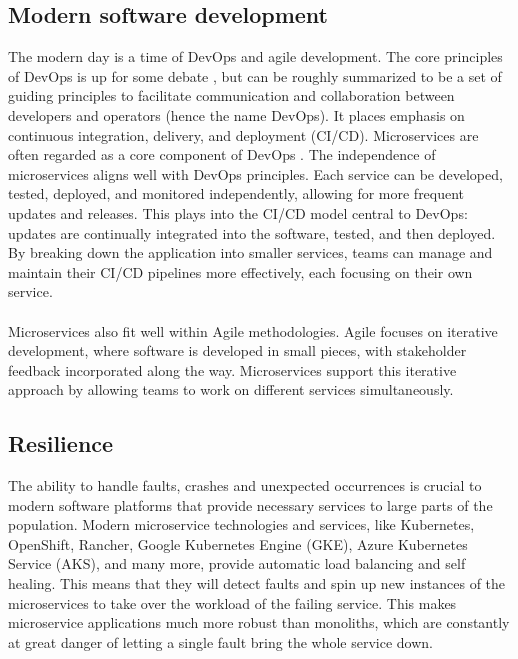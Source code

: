 \subsection{Modern software development}
The modern day is a time of DevOps and agile development.
The core principles of DevOps is up for some debate \cite*{Devops-definition}, but can be roughly summarized to be a set of guiding principles to facilitate communication and collaboration between developers and operators (hence the name DevOps).
It places emphasis on continuous integration, delivery, and deployment (CI/CD).
Microservices are often regarded as a core component of DevOps \cite*{Devops-amazon}.
The independence of microservices aligns well with DevOps principles.
Each service can be developed, tested, deployed, and monitored independently, allowing for more frequent updates and releases.
This plays into the CI/CD model central to DevOps: updates are continually integrated into the software, tested, and then deployed.
By breaking down the application into smaller services, teams can manage and maintain their CI/CD pipelines more effectively, each focusing on their own service.\\
\\
Microservices also fit well within Agile methodologies.
Agile focuses on iterative development, where software is developed in small pieces, with stakeholder feedback incorporated along the way.
Microservices support this iterative approach by allowing teams to work on different services simultaneously.
\subsection{Resilience}
The ability to handle faults, crashes and unexpected occurrences is crucial to modern software platforms that provide necessary services to large parts of the population.
Modern microservice technologies and services, like Kubernetes, OpenShift, Rancher, Google Kubernetes Engine (GKE), Azure Kubernetes Service (AKS), and many more, provide automatic load balancing and self healing.
This means that they will detect faults and spin up new instances of the microservices to take over the workload of the failing service.
This makes microservice applications much more robust than monoliths, which are constantly at great danger of letting a single fault bring the whole service down.

